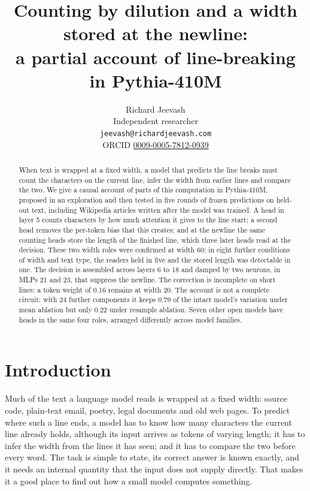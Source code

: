 \documentclass[11pt,a4paper]{article}
\title{Counting by dilution and a width stored at the newline:\\a partial account of line-breaking in Pythia-410M}
\author{Richard Jeevash\\
Independent researcher\\
\texttt{jeevash@richardjeevash.com}\\
ORCID \href{https://orcid.org/0009-0005-7812-0939}{0009-0005-7812-0939}}
\date{}
\begin{document}
\maketitle

\begin{abstract}
When text is wrapped at a fixed width, a model that predicts the line breaks must count the characters on the current line, infer the width from earlier lines and compare the two. We give a causal account of parts of this computation in Pythia-410M, proposed in an exploration and then tested in five rounds of frozen predictions on held-out text, including Wikipedia articles written after the model was trained. A head in layer 5 counts characters by how much attention it gives to the line start; a second head removes the per-token bias that this creates; and at the newline the same counting heads store the length of the finished line, which three later heads read at the decision. These two width roles were confirmed at width 60; in eight further conditions of width and text type, the readers held in five and the stored length was detectable in one. The decision is assembled across layers 6 to 18 and damped by two neurons, in MLPs 21 and 23, that suppress the newline. The correction is incomplete on short lines: a token weight of 0.16 remains at width 20. The account is not a complete circuit: with 24 further components it keeps 0.79 of the intact model's variation under mean ablation but only 0.22 under resample ablation. Seven other open models have heads in the same four roles, arranged differently across model families.
\end{abstract}

\section{Introduction}

Much of the text a language model reads is wrapped at a fixed width: source code, plain-text email, poetry, legal documents and old web pages. To predict where such a line ends, a model has to know how many characters the current line already holds, although its input arrives as tokens of varying length; it has to infer the width from the lines it has seen; and it has to compare the two before every word. The task is simple to state, its correct answer is known exactly, and it needs an internal quantity that the input does not supply directly. That makes it a good place to find out how a small model computes something.
\end{document}
